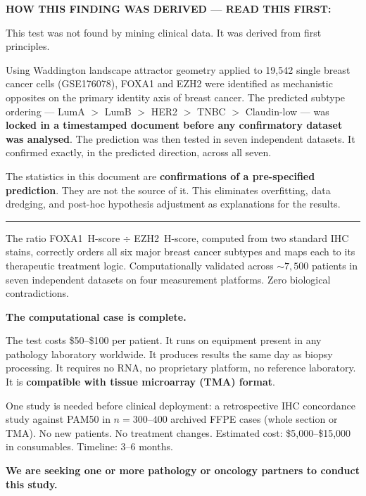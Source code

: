 \documentclass[11pt, a4paper]{article}
\begin{document}
\begin{mdframed}[backgroundcolor=findingbox,
                 linecolor=green!50!black,
                 linewidth=1.5pt]
\textbf{HOW THIS FINDING WAS DERIVED ---
READ THIS FIRST:}

\medskip
This test was not found by mining clinical
data. It was derived from first principles.

Using Waddington landscape attractor geometry
applied to 19,542 single breast cancer cells
(GSE176078), FOXA1 and EZH2 were identified
as mechanistic opposites on the primary
identity axis of breast cancer. The predicted
subtype ordering --- LumA $>$ LumB $>$ HER2
$>$ TNBC $>$ Claudin-low --- was
\textbf{locked in a timestamped document
before any confirmatory dataset was analysed}.
The prediction was then tested in seven
independent datasets. It confirmed exactly,
in the predicted direction, across all seven.

The statistics in this document are
\textbf{confirmations of a pre-specified
prediction}. They are not the source of it.
This eliminates overfitting, data dredging,
and post-hoc hypothesis adjustment as
explanations for the results.

\medskip\noindent\rule{\linewidth}{0.4pt}\medskip

The ratio FOXA1~H-score $\div$ EZH2~H-score,
computed from two standard IHC stains, correctly
orders all six major breast cancer subtypes and
maps each to its therapeutic treatment logic.
Computationally validated across ${\sim}7{,}500$
patients in seven independent datasets on four
measurement platforms. Zero biological
contradictions.

\medskip
\textbf{The computational case is complete.}

\medskip
The test costs \$50--\$100 per patient. It
runs on equipment present in any pathology
laboratory worldwide. It produces results
the same day as biopsy processing. It requires
no RNA, no proprietary platform, no reference
laboratory. It is \textbf{compatible with
tissue microarray (TMA) format}.

\medskip
One study is needed before clinical deployment:
a retrospective IHC concordance study against
PAM50 in $n=300$--$400$ archived FFPE cases
(whole section or TMA). No new patients.
No treatment changes. Estimated cost:
\$5,000--\$15,000 in consumables.
Timeline: 3--6 months.

\medskip
\textbf{We are seeking one or more pathology
or oncology partners to conduct this study.}
\end{mdframed}
\end{document}
